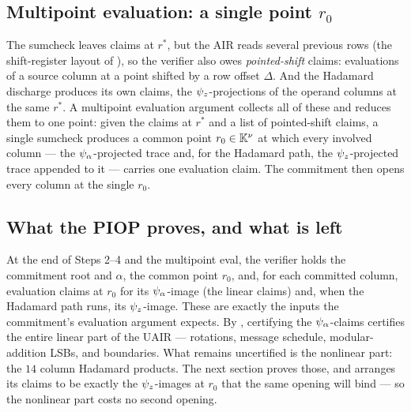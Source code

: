 \subsection{Multipoint evaluation: a single point $r_0$}
\label{sec:multipoint}

The sumcheck leaves claims at $r^*$, but the AIR reads several previous rows
(the shift-register layout of ), so the verifier also owes
\emph{pointed-shift} claims: evaluations of a source column at a point shifted by
a row offset $\Delta$. And the Hadamard discharge produces its own claims, the
$\psi_{z}$-projections of the operand columns at the same $r^*$. A multipoint
evaluation argument collects all of these and reduces them to one point: given
the claims at $r^*$ and a list of pointed-shift claims, a single sumcheck
produces a common point $r_0\in\mathbb{K}^{\nu}$ at which every involved column --- the
$\psi_{\alpha}$-projected trace and, for the Hadamard path, the $\psi_{z}$-projected trace
appended to it --- carries one evaluation claim. The commitment then opens every
column at the single $r_0$.

\subsection{What the PIOP proves, and what is left}
\label{sec:piop-handoff}

At the end of Steps 2--4 and the multipoint eval, the verifier holds the
commitment root and $\alpha$, the common point $r_0$, and, for each committed
column, evaluation claims at $r_0$ for its $\psi_{\alpha}$-image (the linear claims) and,
when the Hadamard path runs, its $\psi_{z}$-image. These are exactly the inputs the
commitment's evaluation argument expects. By ,
certifying the $\psi_{\alpha}$-claims certifies the entire linear part of the UAIR ---
rotations, message schedule, modular-addition LSBs, and boundaries. What remains
uncertified is the nonlinear part: the $14$ column Hadamard products. The next
section proves those, and arranges its claims to be exactly the $\psi_{z}$-images at
$r_0$ that the same opening will bind --- so the nonlinear part costs no second
opening.
